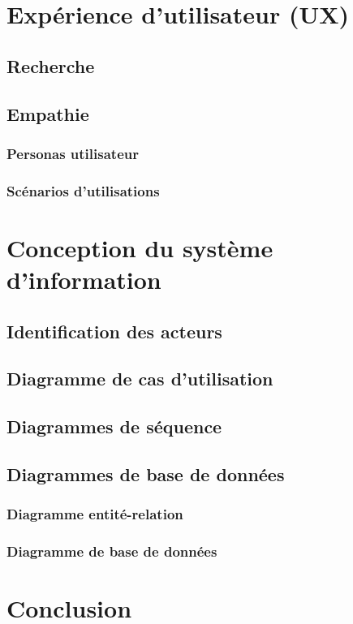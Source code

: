 \section{Expérience d'utilisateur (UX)}
\subsection{Recherche}
\subsection{Empathie}
\subsubsection{Personas utilisateur}
\subsubsection{Scénarios d'utilisations}

\section{Conception du système d'information}
\subsection{Identification des acteurs}
\subsection{Diagramme de cas d'utilisation}
\subsection{Diagrammes de séquence}
\subsection{Diagrammes de base de données}
\subsubsection{Diagramme entité-relation}
\subsubsection{Diagramme de base de données}

\section{Conclusion}

